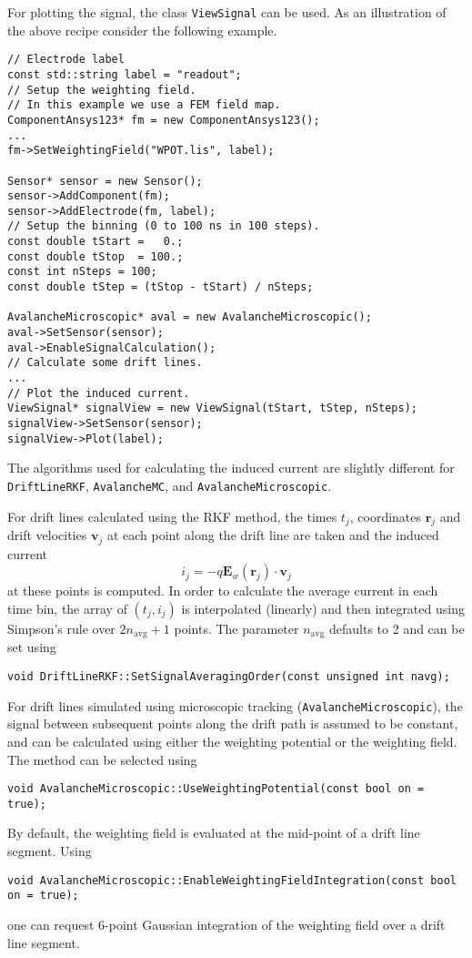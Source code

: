 For plotting the signal, the class \texttt{ViewSignal} can be used.
As an illustration of the above recipe consider the following example. 
\begin{lstlisting}
// Electrode label
const std::string label = "readout";
// Setup the weighting field.
// In this example we use a FEM field map.
ComponentAnsys123* fm = new ComponentAnsys123();
...
fm->SetWeightingField("WPOT.lis", label);

Sensor* sensor = new Sensor();
sensor->AddComponent(fm);
sensor->AddElectrode(fm, label);
// Setup the binning (0 to 100 ns in 100 steps).
const double tStart =   0.;
const double tStop  = 100.;
const int nSteps = 100;
const double tStep = (tStop - tStart) / nSteps;

AvalancheMicroscopic* aval = new AvalancheMicroscopic();
aval->SetSensor(sensor);
aval->EnableSignalCalculation();
// Calculate some drift lines.
...
// Plot the induced current.
ViewSignal* signalView = new ViewSignal(tStart, tStep, nSteps);
signalView->SetSensor(sensor);
signalView->Plot(label);
\end{lstlisting}

The algorithms used for calculating the induced current are slightly different 
for \texttt{DriftLineRKF}, \texttt{AvalancheMC}, and \texttt{AvalancheMicroscopic}.

For drift lines calculated using the RKF method, 
the times $t_j$, coordinates $\mathbf{r}_j$ and drift velocities $\mathbf{v}_j$
at each point along the drift line are taken and the induced current 
\begin{equation*}
  i_{j} = -q \mathbf{E}_{w}\left(\mathbf{r}_{j}\right) \cdot \mathbf{v}_j
\end{equation*}
at these points is computed. In order to calculate the average current 
in each time bin, the array of $\left(t_{j}, i_{j}\right)$ is interpolated 
(linearly) and then integrated using Simpson's rule over $2n_\text{avg} + 1$ points. The parameter $n_\text{avg}$ defaults to 2 and can be set using
\begin{lstlisting}
void DriftLineRKF::SetSignalAveragingOrder(const unsigned int navg);
\end{lstlisting} 

For drift lines simulated using microscopic tracking 
(\texttt{AvalancheMicroscopic}), the signal between subsequent points 
along the drift path is assumed to be constant, and can be 
calculated using either the weighting potential or the weighting field. 
The method can be selected using 
\begin{lstlisting}
void AvalancheMicroscopic::UseWeightingPotential(const bool on = true);
\end{lstlisting}
By default, the weighting field is evaluated at the mid-point of a 
drift line segment. 
Using 
\begin{lstlisting}
void AvalancheMicroscopic::EnableWeightingFieldIntegration(const bool on = true);
\end{lstlisting} 
one can request 6-point Gaussian integration of the weighting field 
over a drift line segment.

